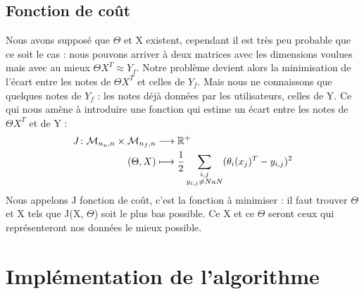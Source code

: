 \documentclass[a4paper,10pt]{article}
\begin{document}
\subsection{Fonction de coût}

Nous avons supposé que $\Theta$ et X existent, cependant il est très peu probable que ce soit le cas : nous pouvons arriver à deux matrices avec les dimensions voulues mais avec au mieux $\Theta X^T \approx Y_f$. Notre problème devient alors la minimisation de l'écart entre les notes de $\Theta X^T$ et celles de $Y_f$. Mais nous ne connaissons que quelques notes de $Y_f$ : les notes déjà données par les utilisateurs, celles de Y. Ce qui nous amène à introduire une fonction qui estime un écart entre les notes de $\Theta X^T$ et de Y :
\begin{align*}
J\colon{\cal M}_{n_u, n} \times {\cal M}_{n_f, n} &\longrightarrow \mathbb{R}^+\\
(\Theta, X)&\longmapsto \frac{1}{2}\sum_{\substack{i,j \\ y_{i,j} \ne NaN}}(\theta_{i}(x_{j})^{T}-y_{i,j})^{2}
\end{align*}
Nous appelons J fonction de coût, c'est la fonction à minimiser : il faut trouver $\Theta$ et X tels que J(X, $\Theta$) soit le plus bas possible. Ce X et ce $\Theta$ seront ceux qui représenteront nos données le mieux possible.

\section{Implémentation de l'algorithme}
\end{document}
